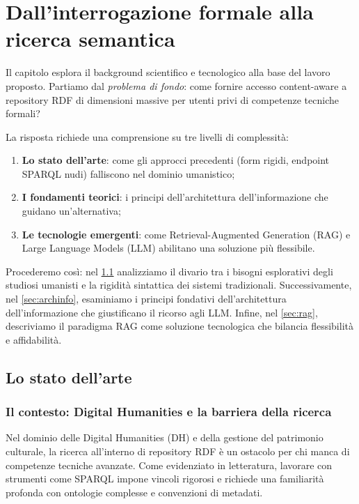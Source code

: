 \chapter{Dall'interrogazione formale alla ricerca semantica}\label{chap:contesto}

Il capitolo esplora il background scientifico e tecnologico alla base del lavoro proposto.
Partiamo dal \textit{problema di fondo}: come fornire accesso content-aware a repository RDF di dimensioni massive per utenti privi di competenze tecniche formali?

La risposta richiede una comprensione su tre livelli di complessità:
\begin{enumerate}
    \item \textbf{Lo stato dell'arte}: come gli approcci precedenti (form rigidi, endpoint SPARQL nudi) falliscono nel dominio umanistico;
    \item \textbf{I fondamenti teorici}: i principi dell'architettura dell'informazione che guidano un'alternativa;
    \item \textbf{Le tecnologie emergenti}: come Retrieval-Augmented Generation (RAG) e Large Language Models (LLM) abilitano una soluzione più flessibile.
\end{enumerate}

Procederemo così: nel \cref{sec:statoarte} analizziamo il divario tra i bisogni esplorativi degli studiosi umanisti e la rigidità sintattica dei sistemi tradizionali. Successivamente, nel \cref{sec:archinfo}, esaminiamo i principi fondativi dell'architettura dell'informazione che giustificano il ricorso agli LLM.\@
Infine, nel \cref{sec:rag}, descriviamo il paradigma RAG come soluzione tecnologica che bilancia flessibilità e affidabilità.

\section{Lo stato dell'arte}\label{sec:statoarte}
\subsection{Il contesto: Digital Humanities e la barriera della ricerca}\label{subsec:dh_barrier}

Nel dominio delle Digital Humanities (DH) e della gestione del patrimonio culturale, la ricerca all'interno di repository RDF è un ostacolo per chi manca di competenze tecniche avanzate.
Come evidenziato in letteratura, lavorare con strumenti come SPARQL impone vincoli rigorosi\cite{Vas25} e richiede una familiarità profonda con ontologie complesse e convenzioni di metadati\cite{Vas24}. 


